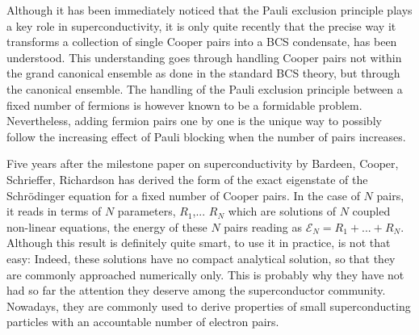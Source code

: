 \documentclass[aps,prb,amsmath,amssymb,superscriptaddress,twocolumn]{revtex4-1}
\newcommand{\E}{\ensuremath{\mathbf{E}}}
\renewcommand{\E}{\ensuremath{\mathcal{E}}}
\begin{document}
\pacs{}

\maketitle


Although it has been immediately noticed that the Pauli exclusion principle plays a key role in superconductivity, it is only quite recently that the precise way it transforms a collection of single Cooper pairs into a BCS condensate, has been understood.  This understanding goes through handling Cooper pairs not within the grand canonical ensemble as done in the standard BCS theory, but through the canonical ensemble.  The handling of the Pauli exclusion principle between a fixed number of fermions is however known to be a formidable problem.  Nevertheless, adding fermion pairs one by one is the unique way to possibly follow the increasing effect of Pauli blocking when the number of pairs increases. 

Five years after the milestone paper on superconductivity by Bardeen, Cooper, Schrieffer\cite{BCS}, Richardson has derived the form of the exact eigenstate of the Schr\"{o}dinger equation for a fixed number of Cooper pairs\cite{Richardson1,Richardson2}.  In the case of $N$ pairs, it reads in terms of $N$ parameters, $R_1$,...  $R_N$ which are solutions of $N$ coupled non-linear equations, the energy of these $N$ pairs reading as $\E_N=R_1+...+R_N$. Although this result is definitely quite smart, to use it in practice, is not that easy: Indeed, these solutions have no compact analytical solution, so that they are commonly approached numerically only. This is probably why they have not had so far the attention they deserve among the superconductor community.  Nowadays, they are commonly used to derive properties of small superconducting particles with an accountable number of electron pairs. 
\end{document}
